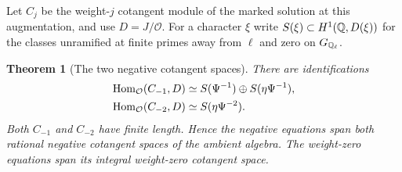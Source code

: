 \documentclass[a4paper,11pt]{article}
\newtheorem{theorem}[proposition]{Theorem}
\theoremstyle{definition}
\theoremstyle{remark}
\numberwithin{equation}{section}
\newcommand{\OO}{\mathcal O}
\begin{document}
Let \(C_j\) be the weight-\(j\) cotangent module of the marked
solution at this augmentation, and use \(D=J/\OO\). For a
character \(\xi\) write \(S(\xi)\subset H^1(\mathbb Q,D(\xi))\)
for the classes unramified at finite primes away from \(\ell\)
and zero on \(G_{\mathbb Q_\ell}\).

\begin{theorem}[The two negative cotangent spaces]\label{thm:cot116}
There are identifications
\begin{align}
 \operatorname{Hom}_\OO(C_{-1},D)
       &\simeq S(\Psi^{-1})\oplus S(\eta\Psi^{-1}),\notag\\
 \operatorname{Hom}_\OO(C_{-2},D)
       &\simeq S(\eta\Psi^{-2}).                              \label{eq:roots116}
\end{align}
Both \(C_{-1}\) and \(C_{-2}\) have finite length. Hence the
negative equations span both rational negative cotangent spaces
of the ambient algebra. The weight-zero equations span its
integral weight-zero cotangent space.
\end{theorem}
\end{document}

